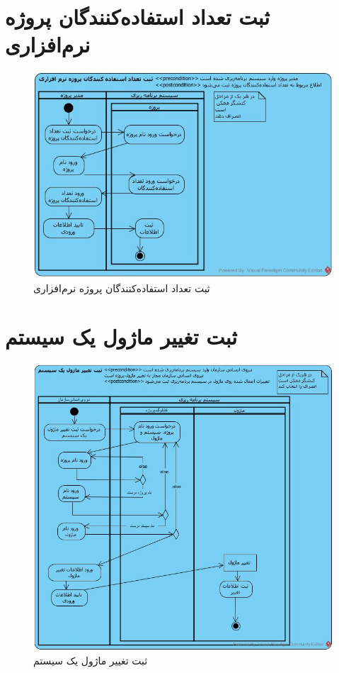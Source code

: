 \section{ثبت تعداد استفاده‌کنندگان پروژه نرم‌افزاری}
\begin{figure}[H]
	\centering
	\includegraphics[scale=0.7]{img/activity/AddUsersCount}
	\caption{ثبت تعداد استفاده‌کنندگان پروژه نرم‌افزاری}
\end{figure}


\section{ثبت تغییر ماژول یک سیستم}
\begin{figure}[H]
	\centering
	\includegraphics[scale=0.6]{img/activity/AddModuleModification}
	\caption{ثبت تغییر ماژول یک سیستم}
\end{figure}


